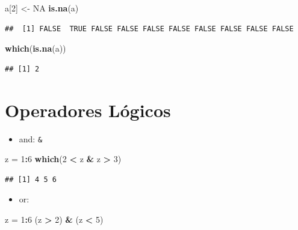 \documentclass[]{book}
\newenvironment{Shaded}{\begin{snugshade}}{\end{snugshade}}
\newcommand{\KeywordTok}[1]{\textcolor[rgb]{0.13,0.29,0.53}{\textbf{#1}}}
\newcommand{\DecValTok}[1]{\textcolor[rgb]{0.00,0.00,0.81}{#1}}
\newcommand{\StringTok}[1]{\textcolor[rgb]{0.31,0.60,0.02}{#1}}
\newcommand{\OtherTok}[1]{\textcolor[rgb]{0.56,0.35,0.01}{#1}}
\newcommand{\OperatorTok}[1]{\textcolor[rgb]{0.81,0.36,0.00}{\textbf{#1}}}
\newcommand{\NormalTok}[1]{#1}
\providecommand{\tightlist}{%
  \setlength{\itemsep}{0pt}\setlength{\parskip}{0pt}}
\begin{document}
\begin{Shaded}
\begin{Highlighting}[]
\NormalTok{ a[}\DecValTok{2}\NormalTok{] <-}\StringTok{ }\OtherTok{NA}
\KeywordTok{is.na}\NormalTok{(a)}
\end{Highlighting}
\end{Shaded}

\begin{verbatim}
##  [1] FALSE  TRUE FALSE FALSE FALSE FALSE FALSE FALSE FALSE FALSE
\end{verbatim}

\begin{Shaded}
\begin{Highlighting}[]
\KeywordTok{which}\NormalTok{(}\KeywordTok{is.na}\NormalTok{(a))}
\end{Highlighting}
\end{Shaded}

\begin{verbatim}
## [1] 2
\end{verbatim}

\section{Operadores Lógicos}\label{operadores-logicos}

\begin{itemize}
\tightlist
\item
  and: \texttt{\&}
\end{itemize}

\begin{Shaded}
\begin{Highlighting}[]
\NormalTok{z =}\StringTok{ }\DecValTok{1}\OperatorTok{:}\DecValTok{6}
\KeywordTok{which}\NormalTok{(}\DecValTok{2} \OperatorTok{<}\StringTok{ }\NormalTok{z }\OperatorTok{&}\StringTok{ }\NormalTok{z }\OperatorTok{>}\StringTok{ }\DecValTok{3}\NormalTok{)}
\end{Highlighting}
\end{Shaded}

\begin{verbatim}
## [1] 4 5 6
\end{verbatim}

\begin{itemize}
\tightlist
\item
  or: \texttt{\textbar{}}
\end{itemize}

\begin{Shaded}
\begin{Highlighting}[]
\NormalTok{z =}\StringTok{ }\DecValTok{1}\OperatorTok{:}\DecValTok{6}
\NormalTok{(z }\OperatorTok{>}\StringTok{ }\DecValTok{2}\NormalTok{) }\OperatorTok{&}\StringTok{ }\NormalTok{(z }\OperatorTok{<}\StringTok{ }\DecValTok{5}\NormalTok{)}
\end{Highlighting}
\end{Shaded}
\end{document}
